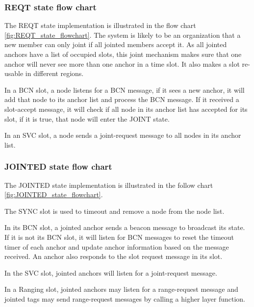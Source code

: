 \documentclass[\main/thesis.tex]{subfiles}
\begin{document}
\subsubsection{REQT state flow chart}
The REQT state implementation is illustrated in the flow chart \ref{fig:REQT_state_flowchart}. The system is likely to be an  organization that a new member can only joint if all jointed members accept it. As all jointed anchors have a list of occupied slots, this joint mechanism makes sure that one anchor will never see more than one anchor in a time slot. It also makes a slot re-usable in different regions.

In a BCN slot, a node listens for a BCN message, if it sees a new anchor, it will add that node to its anchor list and process the BCN message. If it received a slot-accept message, it will check if all node in its anchor list has accepted for its slot, if it is true, that node will enter the JOINT state.

In an SVC slot, a node sends a joint-request message to all nodes in its anchor list.


\subsubsection{JOINTED state flow chart}
The JOINTED state implementation is illustrated in the follow chart \ref{fig:JOINTED_state_flowchart}.

The SYNC slot is used to timeout and remove a node from the node list.

In its BCN slot, a jointed anchor sends a beacon message to broadcast its state. If it is not its BCN slot, it will listen for BCN messages to reset the timeout timer of each anchor and update anchor information based on the message received. An anchor also responds to the slot request message in its slot.

In the SVC slot, jointed anchors will listen for a joint-request message.

In a Ranging slot, jointed anchors may listen for a range-request message and jointed tags may send range-request messages by calling a higher layer function.
\end{document}
